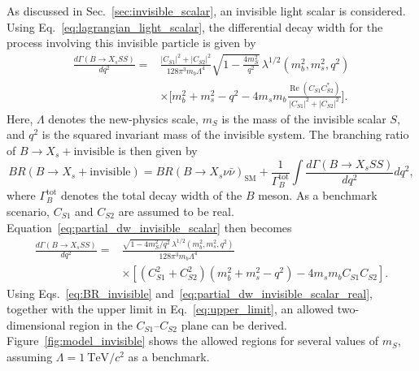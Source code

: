 As discussed in Sec.~\ref{sec:invisible_scalar}, an invisible light
scalar is considered.
Using Eq.~\ref{eq:lagrangian_light_scalar}, the differential decay width
for the process involving this invisible particle is given by
~\cite{Calcuttawala:2017usw}
\begin{equation}
\label{eq:partial_dw_invisible_scalar}
\begin{aligned}
\frac{d\Gamma(B \rightarrow X_s SS)}{dq^2}
={}&
\frac{|C_{S1}|^2 + |C_{S2}|^2}
     {128\pi^3 m_b \Lambda^4}
\sqrt{1-\frac{4m_S^2}{q^2}}\,
\lambda^{1/2}(m_b^2,m_s^2,q^2)
\\
&\times
\Bigg[
m_b^2+m_s^2-q^2
-4m_s m_b
\frac{\operatorname{Re}(C_{S1}C_{S2}^{*})}
     {|C_{S1}|^2+|C_{S2}|^2}
\Bigg].
\end{aligned}
\end{equation}
Here, $\Lambda$ denotes the new-physics scale, $m_{S}$ is the mass of the
invisible scalar $S$, and $q^{2}$ is the squared invariant mass of the
invisible system.
The branching ratio of $B \rightarrow X_{s}+\textrm{invisible}$ is then
given by
\begin{equation}
    \label{eq:BR_invisible}
    BR(B\rightarrow X_{s}+\textrm{invisible})
    =
    BR(B \rightarrow X_{s} \nu \bar{\nu})_{\textrm{SM}}
    +
    \frac{1}{\Gamma_{B}^{\textrm{tot}}}\int\frac{d\Gamma(B \rightarrow X_s SS)}{dq^2}dq^{2},
\end{equation}
where $\Gamma_{B}^{\textrm{tot}}$ denotes the total decay width of the $B$ meson.
As a benchmark scenario, $C_{S1}$ and $C_{S2}$ are assumed to be real.
Equation~\ref{eq:partial_dw_invisible_scalar} then becomes
\begin{equation}
\label{eq:partial_dw_invisible_scalar_real}
\begin{aligned}
\frac{d\Gamma(B \rightarrow X_s SS)}{dq^2}
={}&
\frac{
    \sqrt{1-4m_S^2/q^2}\,
    \lambda^{1/2}(m_b^2,m_s^2,q^2)
}{
    128\pi^3 m_b \Lambda^4
}
\\
&\times
\left[
    (C_{S1}^2+C_{S2}^2)
    (m_b^2+m_s^2-q^2)
    -4m_s m_b C_{S1}C_{S2}
\right].
\end{aligned}
\end{equation}
Using Eqs.~\ref{eq:BR_invisible}
and~\ref{eq:partial_dw_invisible_scalar_real}, together with the upper
limit in Eq.~\ref{eq:upper_limit}, an allowed two-dimensional region in
the $C_{S1}$--$C_{S2}$ plane can be derived.
Figure~\ref{fig:model_invisible} shows the allowed regions for several
values of $m_{S}$, assuming $\Lambda=1~\textrm{TeV}/c^{2}$ as a benchmark.
